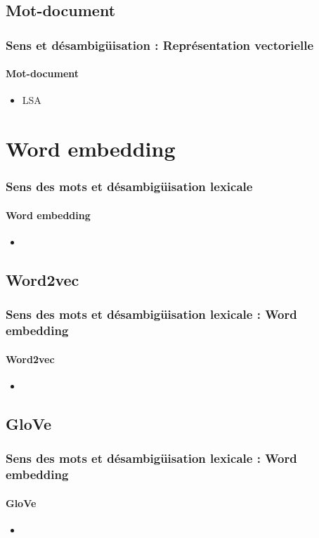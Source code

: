 \documentclass[xcolor=table]{beamer}
\begin{document}
\subsection{Mot-document}

\begin{frame}
\frametitle{Sens et désambigüisation : Représentation vectorielle}
\framesubtitle{Mot-document}

\begin{itemize}
	\item LSA
\end{itemize}

\end{frame}



\section{Word embedding}

\begin{frame}
\frametitle{Sens des mots et désambigüisation lexicale}
\framesubtitle{Word embedding}

\begin{itemize}
	\item 	
\end{itemize}

\end{frame}


\subsection{Word2vec}

\begin{frame}
\frametitle{Sens des mots et désambigüisation lexicale : Word embedding}
\framesubtitle{Word2vec}

\begin{itemize}
	\item 
\end{itemize}

\end{frame}

\subsection{GloVe}

\begin{frame}
\frametitle{Sens des mots et désambigüisation lexicale : Word embedding}
\framesubtitle{GloVe}

\begin{itemize}
	\item 
\end{itemize}

\end{frame}
\end{document}
